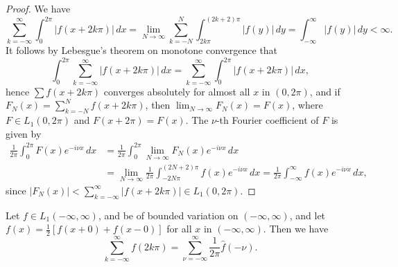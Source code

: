 \begin{proof}
We have
\begin{equation*}
\sum_{k=-\infty}^{\infty}\int_0^{2\pi}|f(x+2k\pi)|\,dx
=\lim_{N\to\infty}\sum_{k=-N}^{N}\int_{2k\pi}^{(2k+2)\pi}|f(y)|\,dy
=\int_{-\infty}^{\infty}|f(y)|\,dy<\infty.
\end{equation*}
It follows by Lebesgue's theorem on monotone convergence that
\begin{equation*}
\int_0^{2\pi}\sum_{k=-\infty}^{\infty}|f(x+2k\pi)|\,dx
=\sum_{k=-\infty}^{\infty}\int_0^{2\pi}|f(x+2k\pi)|\,dx,
\end{equation*}
hence $\sum f(x+2k\pi)$ converges absolutely for almost all $x$ in $(0,2\pi)$, and if $F_N(x)=\sum_{k=-N}^{N}f(x+2k\pi)$, then $\lim_{N\to\infty}F_N(x)=F(x)$, where $F\in L_1(0,2\pi)$ and $F(x+2\pi)=F(x)$. The $\nu$-th Fourier coefficient of $F$ is given by
\begin{align*}
\frac{1}{2\pi}\int_0^{2\pi}F(x)e^{-i\nu x}\,dx
&=\frac{1}{2\pi}\int_0^{2\pi}\lim_{N\to\infty}F_N(x)e^{-i\nu x}\,dx\\
&=\lim_{N\to\infty}\frac{1}{2\pi}\int_{-2N\pi}^{(2N+2)\pi}f(x)e^{-i\nu x}\,dx
=\frac{1}{2\pi}\int_{-\infty}^{\infty}f(x)e^{-i\nu x}\,dx,
\end{align*}
since $|F_N(x)|<\sum_{k=-\infty}^{\infty}|f(x+2k\pi)|\in L_1(0,2\pi)$.
\end{proof}

\begin{theorem}\label{thm:I-6}
Let $f\in L_1(-\infty,\infty)$, and be of bounded variation on $(-\infty,\infty)$, and let $f(x)=\frac12[f(x+0)+f(x-0)]$ for all $x$ in $(-\infty,\infty)$. Then we have
\begin{equation}\label{eq:I-5.5}
\sum_{k=-\infty}^{\infty}f(2k\pi)
=\sum_{\nu=-\infty}^{\infty}\frac{1}{2\pi}\hat f(-\nu).
\end{equation}
\end{theorem}

